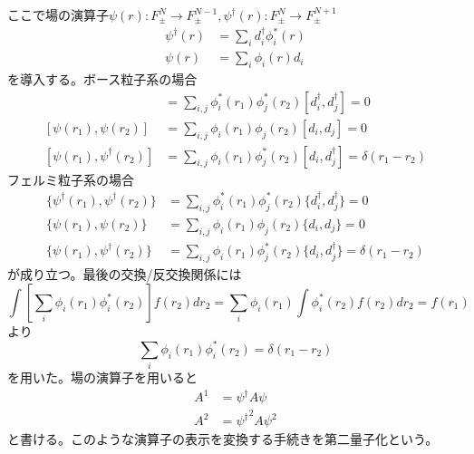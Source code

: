     ここで場の演算子$\psi(r) \colon F_\pm^N \to F_\pm^{N-1}, \psi^\dagger(r) \colon F_\pm^N \to F_\pm^{N+1}$
    \begin{align*}
        \psi^\dagger(r) &= \sum_i d_i^\dagger \phi_i^*(r)\\
        \psi(r) &= \sum_i \phi_i(r)d_i
    \end{align*}
    を導入する。ボース粒子系の場合
    \begin{align*}
        [\psi^\dagger(r_1), \psi^\dagger(r_2)] &= \sum_{i, j} \phi_i^*(r_1)\phi_j^*(r_2) [d_i^\dagger, d_j^\dagger] = 0\\
        [\psi(r_1), \psi(r_2)] &= \sum_{i, j} \phi_i(r_1)\phi_j(r_2) [d_i, d_j] = 0\\
        [\psi(r_1), \psi^\dagger(r_2)] &= \sum_{i, j} \phi_i(r_1)\phi_j^*(r_2) [d_i, d_j^\dagger] = \delta(r_1 - r_2)
    \end{align*}
    フェルミ粒子系の場合
    \begin{align*}
        \{\psi^\dagger(r_1), \psi^\dagger(r_2)\} &= \sum_{i, j} \phi_i^*(r_1)\phi_j^*(r_2) \{d_i^\dagger, d_j^\dagger\} = 0\\
        \{\psi(r_1), \psi(r_2)\} &= \sum_{i, j} \phi_i(r_1)\phi_j(r_2) \{d_i, d_j\} = 0\\
        \{\psi(r_1), \psi^\dagger(r_2)\} &= \sum_{i, j} \phi_i(r_1)\phi_j^*(r_2) \{d_i, d_j^\dagger\} = \delta(r_1 - r_2)
    \end{align*}
    が成り立つ。最後の交換/反交換関係には
        \[\int \left[\sum_i \phi_i(r_1)\phi_i^*(r_2)\right]f(r_2) dr_2 = \sum_i \phi_i(r_1) \int \phi_i^*(r_2)f(r_2) dr_2 = f(r_1)\]
    より
        \[\sum_i \phi_i(r_1)\phi_i^*(r_2) = \delta(r_1 - r_2)\]
    を用いた。場の演算子を用いると
    \begin{align*}
        A^1 &= \psi^\dagger A \psi\\
        A^2 &= {\psi^\dagger}^2 A \psi^2
    \end{align*}
    と書ける。このような演算子の表示を変換する手続きを第二量子化という。